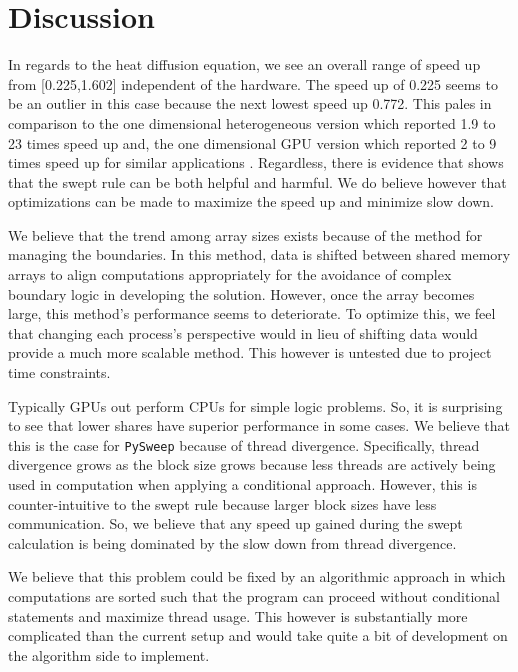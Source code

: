 \documentclass[review]{elsarticle}
\def\pysweep{\texttt{PySweep}}
\begin{document}
\section{Discussion}
\label{discussion-section}
In regards to the heat diffusion equation, we see an overall range of speed up from [0.225,1.602] independent of the hardware. The speed up of 0.225 seems to be an outlier in this case because the next lowest speed up 0.772. This pales in comparison to the one dimensional heterogeneous version which reported 1.9 to 23 times speed up and, the one dimensional GPU version which reported 2 to 9 times speed up for similar applications \cite{Magee2018AcceleratingDecomposition,Magee2020ApplyingSystems}. Regardless, there is evidence that shows that the swept rule can be both helpful and harmful. We do believe however that optimizations can be made to maximize the speed up and minimize slow down. 
\par
We believe that the trend among array sizes exists because of the method for managing the boundaries. In this method, data is shifted between shared memory arrays to align computations appropriately for the avoidance of complex boundary logic in developing the solution. However, once the array becomes large, this method's performance seems to deteriorate. To optimize this, we feel that changing each process's perspective would in lieu of shifting data would provide a much more scalable method. This however is untested due to project time constraints. 
\par
Typically GPUs out perform CPUs for simple logic problems. So, it is surprising to see that lower shares have superior performance in some cases. We believe that this is the case for \pysweep{} because of thread divergence. Specifically, thread divergence grows as the block size grows because less threads are actively being used in computation when applying a conditional approach. However, this is counter-intuitive to the swept rule because larger block sizes have less communication. So, we believe that any speed up gained during the swept calculation is being dominated by the slow down from thread divergence.
\par
We believe that this problem could be fixed by an algorithmic approach in which computations are sorted such that the program can proceed without conditional statements and maximize thread usage. This however is substantially more complicated than the current setup and would take quite a bit of development on the algorithm side to implement.
\end{document}

